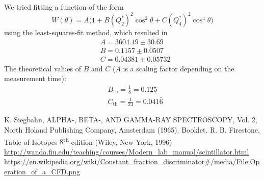 \documentclass[twocolumn]{article}
\begin{document}
We tried fitting a function of the form
\begin{equation}
W(\theta) = A \big(1 + B (Q^{*}_2)^2 \cos^2 \theta + C (Q^{*}_4)^2 \cos^4 \theta \big) \nonumber
\end{equation} 
using the least-squares-fit method, which resulted in
\begin{align*}
&A = 3604.19 \pm 30.69\\
&B = 0.1157  \pm 0.0507\\
&C = 0.04381 \pm 0.05732
\end{align*}
The theoretical values of $B$ and $C$ ($A$ is a scaling factor depending on the measurement time):
\begin{align*}
&B_{\text{th}} = \frac{1}{8} = 0.125\\
&C_{\text{th}} = \frac{1}{24} = 0.041\bar{6}
\end{align*}

\begin{thebibliography}{9}
K. Siegbahn, ALPHA-, BETA-, AND GAMMA-RAY SPECTROSCOPY, Vol. 2, North Holand Publishing Company, Amsterdam (1965).
Booklet.
R. B. Firestone, Table of Isotopes $8$\textsuperscript{th} edition
 (Wiley, New York, 1996)
 \url{http://wanda.fiu.edu/teaching/courses/Modern_lab_manual/scintillator.html}
\url{https://en.wikipedia.org/wiki/Constant_fraction_discriminator#/media/File:Operation_of_a_CFD.png}
\end{thebibliography}
\end{document}
